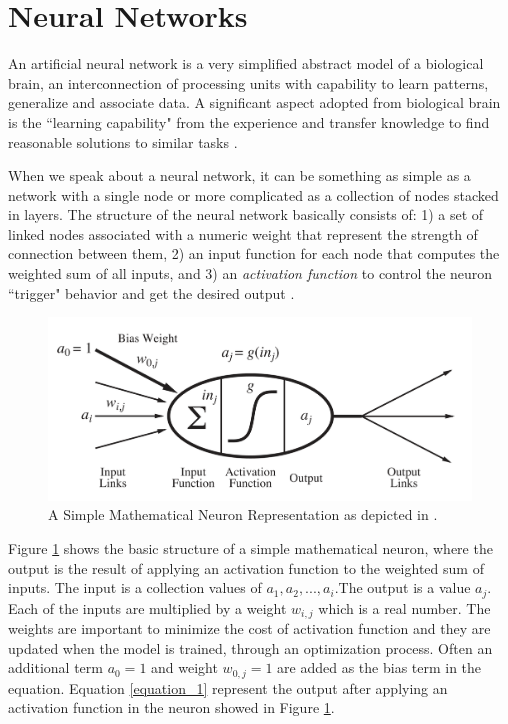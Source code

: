 \documentclass[12pt]{report}
\begin{document}
	
	
	\section{Neural Networks}
	An artificial neural network is a very simplified abstract model of a biological brain, an interconnection of processing units with capability to learn patterns, generalize and associate data. A significant aspect adopted from biological brain is the ``learning capability" from the experience and transfer knowledge to find reasonable solutions to similar tasks \cite{ Gurney2004,Kriesel2005}.
	
	When we speak about a neural network, it can be something as simple as a network with a single node or more complicated as a collection of nodes stacked in layers\cite{ Kriesel2005}. The structure of  the neural network basically consists of:  1) a set of linked nodes  associated with a numeric weight that represent the strength of connection between them, 2) an input function for each node that computes the weighted sum of all inputs, and 3) an {\em activation function} to control the neuron ``trigger" behavior and get the desired output \cite{Russell2010,Kriesel2005} . 
	
	\begin{figure}[H]	
		\centering
		\includegraphics[width=130mm, scale = 1]{images/3_neuron.png}	
		\caption{A Simple Mathematical Neuron Representation as depicted in \cite{Russell2010}.}	
		\label{figure:Mathematical_Neuron}
	\end{figure}
	
	Figure \ref{figure:Mathematical_Neuron} shows the basic structure of a simple mathematical neuron, where the output is the result of applying an activation function to the weighted sum of inputs. The input is a collection values of $a_1, a_2, ..., a_i$.The output is a value $a_j$. Each of the inputs are multiplied by a weight $w_{i,j}$ which is a real number. The weights are important to minimize the cost of activation function and they are updated when the model is trained, through an optimization process. Often an additional term $a_0=1$ and weight $w_{0,j}=1$ are added as the bias term in the equation. Equation \ref{equation_1} represent the output after applying an activation function in the neuron showed in Figure \ref{figure:Mathematical_Neuron}.
	
\end{document}
